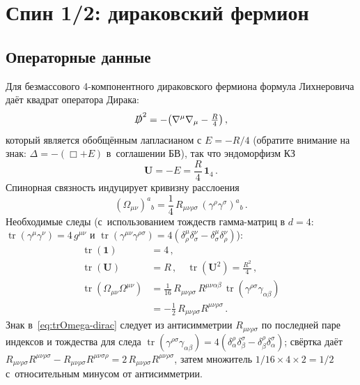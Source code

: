 \documentclass[aps,prd,twocolumn,superscriptaddress,nofootinbib,floatfix]{revtex4-2}
\theoremstyle{definition}
\theoremstyle{remark}
\newcommand{\Riemsq}{R_{\mu\nu\rho\sigma}R^{\mu\nu\rho\sigma}}
\newcommand{\tr}{\operatorname{tr}}
\begin{document}
\section{Спин 1/2: дираковский фермион}
\label{sec:dirac}

\subsection{Операторные данные}

Для безмассового 4-компонентного дираковского фермиона формула Лихнеровича
даёт квадрат оператора Дирака:
\begin{equation}
  \slashed{D}^2 = -\bigl(\nabla^\mu\nabla_\mu - \tfrac{R}{4}\bigr)\,,
  \label{eq:lichnerowicz}
\end{equation}
который является обобщённым лапласианом с $E = -R/4$ (обратите внимание на
знак: $\Delta = -(\Box + E)$ в~соглашении БВ), так что эндоморфизм КЗ
\begin{equation}
  \mathbf{U} = -E = \frac{R}{4}\,\mathbf{1}_4\,.
  \label{eq:U-dirac}
\end{equation}
Спинорная связность индуцирует кривизну расслоения
\begin{equation}
  (\Omega_{\mu\nu})^a{}_b = \frac{1}{4}\,R_{\mu\nu\rho\sigma}\,
    (\gamma^{\rho}\gamma^{\sigma})^a{}_b\,.
  \label{eq:Omega-dirac}
\end{equation}
Необходимые следы (с~использованием тождеств гамма-матриц в $d = 4$:
$\tr(\gamma^\mu\gamma^\nu) = 4\,g^{\mu\nu}$ и
$\tr(\gamma^{\mu\nu}\gamma^{\rho\sigma}) =
4(\delta^\mu_\rho\delta^\nu_\sigma - \delta^\mu_\sigma\delta^\nu_\rho)$):
\begin{subequations}
\label{eq:dirac-traces}
\begin{align}
  \tr(\mathbf{1}) &= 4\,,\\
  \tr(\mathbf{U}) &= R\,,\quad
  \tr(\mathbf{U}^2) = \frac{R^2}{4}\,,\\
  \tr(\Omega_{\mu\nu}\Omega^{\mu\nu})
    &= \frac{1}{16}\,R_{\mu\nu\rho\sigma}\,R^{\mu\nu\alpha\beta}\,
    \tr(\gamma^{\rho\sigma}\gamma_{\alpha\beta}) \nonumber\\
    &= -\frac{1}{2}\,\Riemsq\,.
  \label{eq:trOmega-dirac}
\end{align}
\end{subequations}
Знак в~\eqref{eq:trOmega-dirac} следует из антисимметрии
$R_{\mu\nu\rho\sigma}$ по последней паре индексов и тождества для следа
$\tr(\gamma^{\rho\sigma}\gamma_{\alpha\beta}) =
4(\delta^\rho_\alpha\delta^\sigma_\beta -
\delta^\rho_\beta\delta^\sigma_\alpha)$; свёртка даёт
$R_{\mu\nu\rho\sigma}R^{\mu\nu\rho\sigma} - R_{\mu\nu\rho\sigma}R^{\mu\nu\sigma\rho} = 2\,\Riemsq$,
затем множитель $1/16 \times 4 \times 2 = 1/2$ с~относительным минусом
от антисимметрии.
\end{document}
